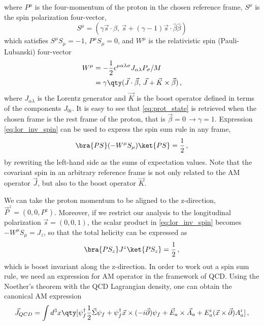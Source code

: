 where $P^{\mu}$ is the four-momentum of the proton in the chosen reference frame, $S^{\mu}$ is the spin polarization four-vector,
\begin{equation}
    S^{\mu} = (\gamma \vec{s} \cdot \beta, \, \vec{s} + (\gamma - 1) \vec{s} \cdot \hat{\beta} \hat{\beta})
\end{equation}
which satisfies $S^{\mu} S_{\mu} = -1$, $P^{\mu} S_{\mu} = 0$, and $W^{\mu}$ is the relativistic spin (Pauli-Lubanski) four-vector 
\begin{equation}
    \begin{split}
        W^{\mu} & = -\frac{1}{2} \epsilon^{\mu \alpha \lambda \sigma} J_{\alpha \lambda} P_{\sigma}/M \\
        & = \gamma \qty( \vec{J} \cdot \vec{\beta}, \, \vec{J} + \vec{K} \times \vec{\beta} )\,,
    \end{split}
\end{equation}
where $J_{\alpha \lambda}$ is the Lorentz generator and $\vec{K}$ is the boost operator defined in terms of the components $J_{0i}$. It is easy to see that \eqref{eq:prot_state} is retrieved when the chosen frame is the rest frame of the proton, that is $\vec{\beta} = 0 \, \rightarrow \gamma = 1$. Expression \eqref{eq:lor_inv_spin} can be used to express the spin sum rule in any frame, 
\begin{equation}
    \bra{PS} (- W^{\mu}S_{\mu}) \ket{PS}  = \frac{1}{2} \,,
\end{equation}
by rewriting the left-hand side as the sums of expectation values. Note that the covariant spin in an arbitrary reference frame is not only related to the AM operator $\vec{J}$, but also to the boost operator $\vec{K}$.\par
We can take the proton momentum to be aligned to the z-direction, $\vec{P}^{z} = (0,0,P^{z})$. Moreover, if we restrict our analysis to the longitudinal polarization $\vec{s} = (0,0,1)$, the scalar product in \eqref{eq:lor_inv_spin} becomes $-W^{\mu} S_{\mu} = J_{z}$, so that the total helicity can be expressed as
\begin{equation}
    \bra{P S_z} J^{z} \ket{P S_z} = \frac{1}{2} \,,
\end{equation} 
which is boost invariant along the z-direction. In order to work out a spin sum rule, we need an expression for AM operator in the framework of QCD. Using the Noether's theorem with the QCD Lagrangian density, one can obtain the canonical AM expression 
\begin{equation}
    \vec{J}_{QCD} = \int d^3 x \qty [ \psi^{\dag}_{f} \frac{1}{2} \vec{\Sigma} \psi_{f} +  \psi^{\dag}_{f} \vec{x} \times (-i \vec{\partial}) \psi_{f} + \vec{E}_{a} \times \vec{A}_{a} + E^{i}_{a} (\vec{x} \times \vec{\partial}) A_{a}^i] \,,
    \label{eq:can_spin_dec_qft}
\end{equation}
